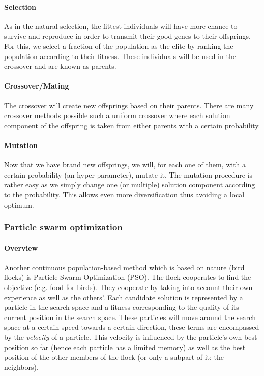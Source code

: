     \paragraph{Selection}
        As in the natural selection, the fittest individuals will have more chance to survive and reproduce in order to transmit their good genes to their offsprings. For this, we select a fraction of the population as the elite by ranking the population according to their fitness. These individuals will be used in the crossover and are known as parents.
    
    \paragraph{Crossover/Mating}
        The crossover will create new offsprings based on their parents. There are many crossover methods possible such a uniform crossover where each solution component of the offspring is taken from either parents with a certain probability. 
    
    \paragraph{Mutation} 
        Now that we have brand new offsprings, we will, for each one of them, with a certain probability (an hyper-parameter), mutate it. The mutation procedure is rather easy as we simply change one (or multiple) solution component according to the probability.
        This allows even more diversification thus avoiding a local optimum.

    \subsubsection{Particle swarm optimization}

    \paragraph{Overview}
        Another continuous population-based method which is based on nature (bird flocks) is Particle Swarm Optimization (PSO). The flock cooperates to find the objective (e.g. food for birds). They cooperate by taking into account their own experience as well as the others'. \cite{pso} Each candidate solution is represented by a particle in the search space and a fitness corresponding to the quality of its current position in the search space. These particles will move around the search space at a certain speed towards a certain direction, these terms are encompassed by the \emph{velocity} of a particle. This velocity is influenced by the particle's own best position so far (hence each particle has a limited memory) as well as the best position of the other members of the flock (or only a subpart of it: the neighbors).

